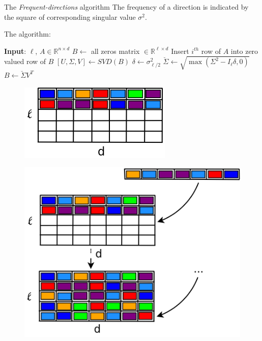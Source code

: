\documentclass[first=dgreen,second=purple,logo=redque]{aaltoslides}
\begin{document}
\begin{frame}[allowframebreaks=1]{The \textit{Frequent-directions} algorithm}
The \textcolor{dgreen}{frequency} of a direction is indicated by the square of corresponding singular value $\sigma^2$.

\framebreak
The algorithm:
  \begin{algorithmic}
    \State \textbf{Input}: $\ell$, $A \in \mathbb{R}^{n\times d}$
    \State $B \leftarrow $ all zeros matrix $\in \mathbb{R}^{\ell\times d}$
    \State Insert $i^{th}$ row of $A$ into zero valued row of $B$
      \State $[U,\Sigma,V] \leftarrow SVD(B)$
      \State $\delta \leftarrow \sigma_{\ell/2}^2$
      \State $\breve{\Sigma} \leftarrow \sqrt{\max(\Sigma^2-I_\ell\delta,0)}$
      \State $B\leftarrow \breve{\Sigma}V^T$
    \EndIf
    \EndFor
  \end{algorithmic}
  
\framebreak

\begin{figure}
  \includegraphics[scale=0.45]{plots/fd1}
 \label{fig:fd1}
\end{figure}

\framebreak

\begin{figure}
  \includegraphics[scale=0.35]{plots/fd2}
 \label{fig:fd2}
\end{figure}


\end{frame}
\end{document}

